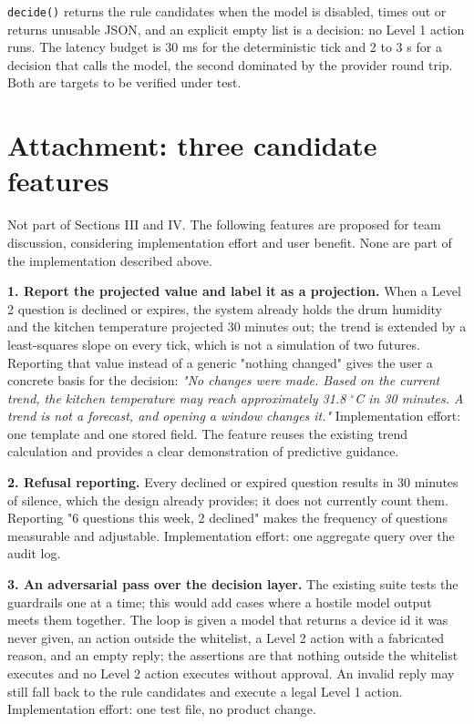 \documentclass[conference]{IEEEtran}
\begin{document}
\texttt{decide()} returns the rule candidates when the model is disabled, times out or returns unusable JSON, and an explicit empty list is a decision: no Level 1 action runs. The latency budget is 30 ms for the deterministic tick and 2 to 3 s for a decision that calls the model, the second dominated by the provider round trip. Both are targets to be verified under test.

\clearpage

\section*{Attachment: three candidate features}

Not part of Sections III and IV. The following features are proposed for team discussion, considering implementation effort and user benefit. None are part of the implementation described above.

\textbf{1. Report the projected value and label it as a projection.} When a Level 2 question is declined or expires, the system already holds the drum humidity and the kitchen temperature projected 30 minutes out; the trend is extended by a least-squares slope on every tick, which is not a simulation of two futures. Reporting that value instead of a generic "nothing changed" gives the user a concrete basis for the decision: \emph{"No changes were made. Based on the current trend, the kitchen temperature may reach approximately 31.8 $^{\circ}$C in 30 minutes. A trend is not a forecast, and opening a window changes it."} Implementation effort: one template and one stored field. The feature reuses the existing trend calculation and provides a clear demonstration of predictive guidance.

\textbf{2. Refusal reporting.} Every declined or expired question results in 30 minutes of silence, which the design already provides; it does not currently count them. Reporting "6 questions this week, 2 declined" makes the frequency of questions measurable and adjustable. Implementation effort: one aggregate query over the audit log.

\textbf{3. An adversarial pass over the decision layer.} The existing suite tests the guardrails one at a time; this would add cases where a hostile model output meets them together. The loop is given a model that returns a device id it was never given, an action outside the whitelist, a Level 2 action with a fabricated reason, and an empty reply; the assertions are that nothing outside the whitelist executes and no Level 2 action executes without approval. An invalid reply may still fall back to the rule candidates and execute a legal Level 1 action. Implementation effort: one test file, no product change.
\end{document}
